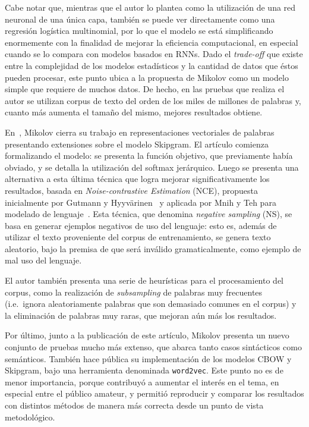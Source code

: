 Cabe notar que, mientras que el autor lo plantea como la utilización de una red neuronal de una
única capa, también se puede ver directamente como una regresión logística multinomial, por lo que
el modelo se está simplificando enormemente con la finalidad de mejorar la eficiencia computacional,
en especial cuando se lo compara con modelos basados en RNNs. Dado el \textit{trade-off} que existe
entre la complejidad de los modelos estadísticos y la cantidad de datos que éstos pueden procesar,
este punto ubica a la propuesta de Mikolov como un modelo simple que requiere de muchos datos. De
hecho, en las pruebas que realiza el autor se utilizan corpus de texto del orden de los miles de
millones de palabras y, cuanto más aumenta el tamaño del mismo, mejores resultados obtiene.

En~\cite{Mikolov2013c}, Mikolov cierra su trabajo en representaciones vectoriales de palabras
presentando extensiones sobre el modelo Skipgram. El artículo comienza formalizando el modelo: se
presenta la función objetivo, que previamente había obviado, y se detalla la utilización del softmax
jerárquico. Luego se presenta una alternativa a esta última técnica que logra mejorar
significativamente los resultados, basada en \textit{Noise-contrastive Estimation} (NCE), propuesta
inicialmente por Gutmann y Hyyvärinen~\cite{Gutmann2012} y aplicada por Mnih y Teh para modelado de
lenguaje~\cite{MnihTeh2012}. Esta técnica, que denomina \textit{negative sampling} (NS), se basa en
generar ejemplos negativos de uso del lenguaje: esto es, además de utilizar el texto proveniente del
corpus de entrenamiento, se genera texto aleatorio, bajo la premisa de que será inválido
gramaticalmente, como ejemplo de mal uso del lenguaje.

El autor también presenta una serie de heurísticas para el procesamiento del corpus, como la
realización de \textit{subsampling} de palabras muy frecuentes (i.e.\ ignora aleatoriamente palabras que
son demasiado comunes en el corpus) y la eliminación de palabras muy raras, que mejoran aún más los
resultados.

Por último, junto a la publicación de este artículo, Mikolov presenta un nuevo conjunto de pruebas
mucho más extenso, que abarca tanto casos sintácticos como semánticos. También hace pública su
implementación de los modelos CBOW y Skipgram, bajo una herramienta denominada
\texttt{word2vec}. Este punto no es de menor importancia, porque contribuyó a aumentar el interés en
el tema, en especial entre el público amateur, y permitió reproducir y comparar los resultados con
distintos métodos de manera más correcta desde un punto de vista metodológico.



